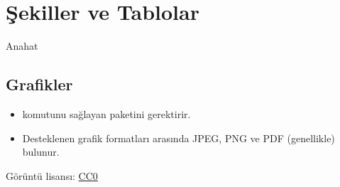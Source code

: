 \documentclass[aspectratio=169]{beamer}
\begin{document}
\section{Şekiller ve Tablolar}

\begin{frame}{Anahat}
\begin{multicols}{2}
\tableofcontents[currentsection]
\end{multicols}
\end{frame}

\subsection{Grafikler}
\begin{frame}[fragile]{\insertsubsection}
\begin{itemize}
\item {} komutunu sağlayan  paketini gerektirir.
\item Desteklenen grafik formatları arasında JPEG, PNG ve PDF (genellikle) bulunur.
\end{itemize}

\tiny{Görüntü lisansı: \href{https://pixabay.com/en/animal-apple-attractive-beautiful-1239390/}{CC0}}
\end{frame}
\end{document}
